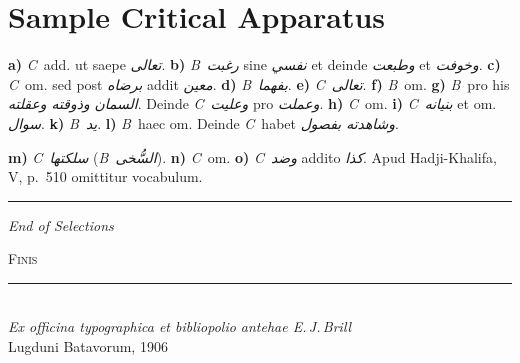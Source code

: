 \documentclass[11pt,a4paper]{article}
\newcommand{\shortline}{\noindent\rule{0.5\textwidth}{0.4pt}\par}
\newcommand{\B}{\textit{B}}
\newcommand{\C}{\textit{C}}
\begin{document}
\section{Sample Critical Apparatus}

\begin{footnotesize}
\noindent\textbf{a)} \C\ add. ut saepe \textit{تعالى}. \textbf{b)} \B\ \textit{رغبت} sine \textit{نفسي} et deinde \textit{وطبعت} et \textit{وخوفت}. \textbf{c)} \C\ om. sed post \textit{برضاه} addit \textit{معين}. \textbf{d)} \B\ \textit{بفهما}. \textbf{e)} \C\ \textit{تعالى}. \textbf{f)} \B\ om. \textbf{g)} \B\ pro his \textit{السمان} \textit{وذوقته وعقلته}. Deinde \C\ \textit{وعليت} pro \textit{وعملت}. \textbf{h)} \C\ om. \textbf{i)} \C\ \textit{بنيانه} et om. \textit{سوال}. \textbf{k)} \B\ \textit{يد}. \textbf{l)} \B\ haec om. Deinde \C\ habet \textit{وشاهدته بفصول}.

\vspace{0.3cm}

\noindent\textbf{m)} \C\ \textit{سلكتها} (\B\ \textit{السُّخى}). \textbf{n)} \C\ om. \textbf{o)} \C\ \textit{وضد} addito \textit{كذا}. Apud Hadji-Khalifa, V, p.~510 omittitur vocabulum.
\end{footnotesize}

\vspace{0.5cm}

\noindent\rule{\textwidth}{0.4pt}

\begin{center}
\textit{End of Selections}
\end{center}

\clearpage


\thispagestyle{empty}
\vspace*{5cm}

\begin{center}
{\large\textsc{Finis}}\\[1cm]

\shortline\\[1cm]

{\small\textit{Ex officina typographica et bibliopolio antehae E.\,J.\,Brill}}\\[0.5cm]
{\small Lugduni Batavorum, 1906}

\end{center}

\clearpage
\end{document}
